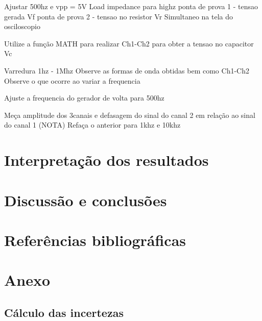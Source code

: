 \documentclass[a4paper,12pt,onecolumn]{article}
\numberwithin{equation}{section}
\numberwithin{figure}{section}
\begin{document}

Ajustar 500hz e vpp = 5V Load impedance para highz 
ponta de prova 1 - tensao gerada Vf
ponta de prova 2 - tensao no resistor Vr
Simultaneo na tela do osciloscopio

Utilize a função MATH para realizar Ch1-Ch2 para obter a tensao no capacitor Vc

Varredura 1hz - 1Mhz
Observe as formas de onda obtidas bem como Ch1-Ch2 Observe o que ocorre ao variar a frequencia

Ajuste a frequencia do gerador de volta para 500hz

Meça amplitude dos 3canais e defasagem do sinal do canal 2 em relação ao sinal do canal 1 (NOTA)
Refaça o anterior para 1khz  e 10khz



\newpage
\section{Interpretação dos resultados}


\newpage
\section{Discussão e conclusões}


\newpage
\section{Referências bibliográficas}

\newpage
\section{Anexo}
\subsection{Cálculo das incertezas}
\end{document}
